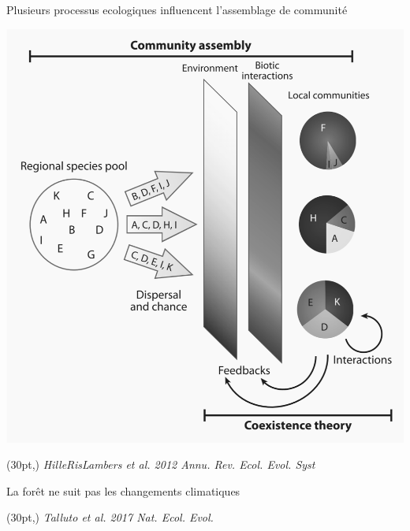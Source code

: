 \documentclass[11pt, compress, aspectratio=1610]{beamer}
\newcommand\smallcitation[1]{%
\begin{textblock*}{\textwidth}(30pt,\textheight)
	\raggedleft \footnotesize\textit{#1}
\end{textblock*}}
\begin{document}
\begin{frame}{Plusieurs processus ecologiques influencent l’assemblage
de communité}
\protect\hypertarget{plusieurs-processus-ecologiques-influencent-lassemblage-de-communituxe9}{}

\vspace*{-5mm}
\centering

\includegraphics[scale=0.4]{figures/HilleRisLambers.png}

\par

\smallcitation{HilleRisLambers et al. 2012 Annu. Rev. Ecol. Evol. Syst}

\end{frame}

\begin{frame}{La forêt ne suit pas les changements climatiques}
\protect\hypertarget{la-foruxeat-ne-suit-pas-les-changements-climatiques}{}

\vspace*{-15mm}
\begin{center}
\end{center}
\smallcitation{Talluto \textit{et al}. 2017 Nat. Ecol. Evol.}

\end{frame}
\end{document}
